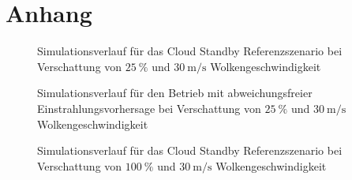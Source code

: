 \appendix
\chapter{Anhang}\label{ch_anhang}
\begin{figure}[h!]
    \centering
    \setlength{\fboxsep}{1pt}
    \setlength{\fboxrule}{1pt}
    \caption[Simulationsverlauf für das Cloud Standby Referenzszenario bei Verschattung von $\SI{25}{\percent}$ und $\SI{30}{\metre\per\second}$ Wolkengeschwindigkeit]{Simulationsverlauf für das Cloud Standby Referenzszenario bei Verschattung von $\SI{25}{\percent}$ und $\SI{30}{\metre\per\second}$ Wolkengeschwindigkeit}
    \label{fig_nocontrol7530}
\end{figure}

\begin{figure}[h!]
    \centering
    \setlength{\fboxsep}{1pt}
    \setlength{\fboxrule}{1pt}
    \caption[Simulationsverlauf für den Betrieb mit abweichungsfreier Einstrahlungsvorhersage bei Verschattung von $\SI{25}{\percent}$ und $\SI{30}{\metre\per\second}$ Wolkengeschwindigkeit]{Simulationsverlauf für den Betrieb mit abweichungsfreier Einstrahlungsvorhersage bei Verschattung von $\SI{25}{\percent}$ und $\SI{30}{\metre\per\second}$ Wolkengeschwindigkeit}
    \label{fig_allwissend7530}
\end{figure}

\begin{figure}[h!]
    \centering
    \setlength{\fboxsep}{1pt}
    \setlength{\fboxrule}{1pt}
    \caption[Simulationsverlauf für das Cloud Standby Referenzszenario bei Verschattung von $\SI{100}{\percent}$ und $\SI{30}{\metre\per\second}$ Wolkengeschwindigkeit]{Simulationsverlauf für das Cloud Standby Referenzszenario bei Verschattung von $\SI{100}{\percent}$ und $\SI{30}{\metre\per\second}$ Wolkengeschwindigkeit}
    \label{fig_cloudstandby0030}
\end{figure}

